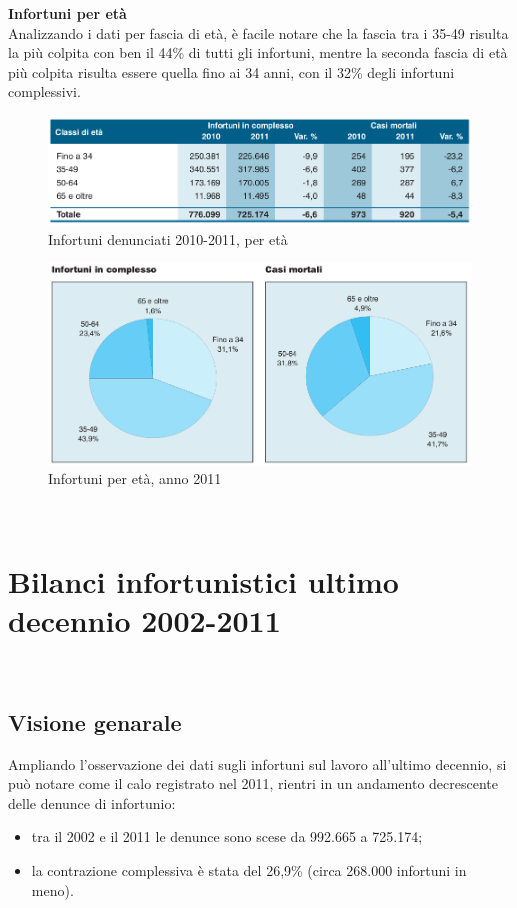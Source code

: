 \textbf{Infortuni per età}\\
Analizzando i dati per fascia di età, è facile notare che la fascia tra i 35-49 risulta la più colpita con ben il 44\% di tutti gli infortuni, mentre la seconda fascia di età più colpita risulta essere quella fino ai 34 anni, con il 32\% degli infortuni complessivi.

\begin{figure}[H]
\centering
\includegraphics[scale=0.5]{images/cap4/analisiDiMercato/infortuniPerEta1}
\caption{Infortuni denunciati 2010-2011, per età}
\end{figure}

\begin{figure}[H]
\centering
\includegraphics[scale=0.53]{images/cap4/analisiDiMercato/infortuniPerEta2}
\caption{Infortuni per età, anno 2011}
\end{figure}







\ \ \
\section{Bilanci infortunistici ultimo decennio 2002-2011}
\ \
\subsection{Visione genarale}

Ampliando l'osservazione dei dati sugli infortuni sul lavoro all'ultimo decennio, si può notare come il calo registrato nel 2011, rientri in un andamento decrescente delle denunce di infortunio:
\begin{itemize}
\item tra il 2002 e il 2011 le denunce sono scese da 992.665 a 725.174;
\item la contrazione complessiva è stata del 26,9\% (circa 268.000 infortuni in meno).
\end{itemize}




